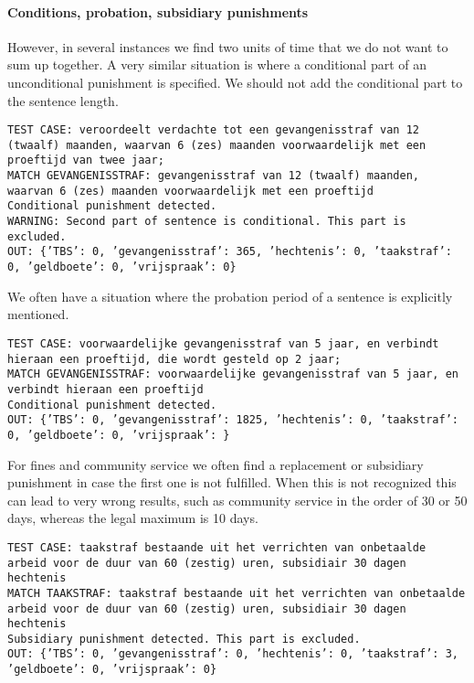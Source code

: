 \documentclass[a4paper]{article}
\begin{document}
\paragraph{Conditions, probation, subsidiary punishments}

However, in several instances we find two units of time that we do not want to sum up together.
A very similar situation is where a conditional part of an unconditional punishment is specified.
We should not add the conditional part to the sentence length.

\texttt{TEST CASE: %
veroordeelt verdachte tot een gevangenisstraf van 12 (twaalf) maanden, waarvan  6 (zes) maanden voorwaardelijk met een proeftijd van twee jaar;\\
MATCH GEVANGENISSTRAF: gevangenisstraf van 12 (twaalf) maanden, waarvan  6 (zes) maanden voorwaardelijk met een proeftijd\\
Conditional punishment detected.\\
WARNING: Second part of sentence is conditional. This part is excluded.\\
OUT: \{'TBS': 0, 'gevangenisstraf': 365, 'hechtenis': 0, 'taakstraf': 0, 'geldboete': 0, 'vrijspraak': 0\}}

We often have a situation where the probation period of a sentence is explicitly mentioned.

\texttt{TEST CASE: %
voorwaardelijke gevangenisstraf van 5 jaar, en verbindt hieraan een proeftijd, die wordt gesteld op 2 jaar;\\
MATCH GEVANGENISSTRAF: voorwaardelijke gevangenisstraf van 5 jaar, en verbindt hieraan een proeftijd\\
Conditional punishment detected.\\
OUT: \{'TBS': 0, 'gevangenisstraf': 1825, 'hechtenis': 0, 'taakstraf': 0, 'geldboete': 0, 'vrijspraak': \}}

For fines and community service we often find a replacement or subsidiary punishment in case the first one is not fulfilled.
When this is not recognized this can lead to very wrong results, such as community service in the order of 30 or 50 days, whereas the legal maximum is 10 days.

\texttt{TEST CASE: %
taakstraf bestaande uit het verrichten van onbetaalde arbeid voor de duur van 60 (zestig) uren, subsidiair 30 dagen hechtenis\\
MATCH TAAKSTRAF: taakstraf bestaande uit het verrichten van onbetaalde arbeid voor de duur van 60 (zestig) uren, subsidiair 30 dagen hechtenis\\
Subsidiary punishment detected. This part is excluded.\\
OUT: \{'TBS': 0, 'gevangenisstraf': 0, 'hechtenis': 0, 'taakstraf': 3, 'geldboete': 0, 'vrijspraak': 0\}}
\end{document}
